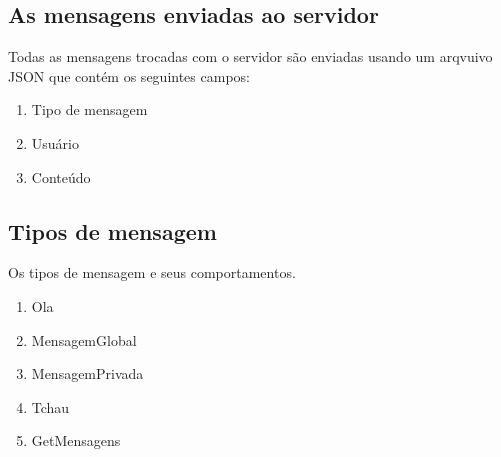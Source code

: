 \documentclass{article}
\begin{document}
{{        \subsection{As mensagens enviadas ao servidor}
        {
            Todas as mensagens trocadas com o servidor são enviadas usando um arqvuivo JSON que contém os seguintes campos:
            \begin{enumerate}
                \item Tipo de mensagem
                \item Usuário
                \item Conteúdo
            \end{enumerate}
        }
        \subsection{Tipos de mensagem}
        {
            Os tipos de mensagem e seus comportamentos.
            \\ \begin{enumerate}
                \item Ola
                \item MensagemGlobal
                \item MensagemPrivada
                \item Tchau
                \item GetMensagens
            \end{enumerate}
        }
        
        
}}
\end{document}
